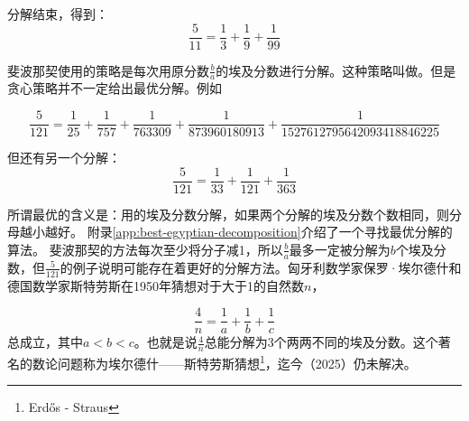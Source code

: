 \documentclass[b5paper]{ctexart}
\begin{document}
分解结束，得到：
\[
\frac{5}{11} = \frac{1}{3} + \frac{1}{9} + \frac{1}{99}
\]

斐波那契使用的策略是每次用原分数$\frac{b}{a}$的埃及分数进行分解。这种策略叫做。但是贪心策略并不一定给出最优分解。例如

\[
\frac{5}{121} = \frac{1}{25} + \frac{1}{757} + \frac{1}{763309} + \frac{1}{873960180913} + \frac{1}{1527612795642093418846225}
\]

但还有另一个分解：
\[
\frac{5}{121} = \frac{1}{33} + \frac{1}{121} + \frac{1}{363}
\]

所谓最优的含义是：用的埃及分数分解，如果两个分解的埃及分数个数相同，则分母越小越好。
附录\ref{app:best-egyptian-decomposition}介绍了一个寻找最优分解的算法。
斐波那契的方法每次至少将分子减1，所以$\frac{b}{a}$最多一定被分解为$b$个埃及分数，但$\frac{5}{121}$的例子说明可能存在着更好的分解方法。匈牙利数学家保罗·埃尔德什和德国数学家斯特劳斯在1950年猜想对于大于1的自然数$n$，

\[
\frac{4}{n} = \frac{1}{a} + \frac{1}{b} + \frac{1}{c}
\]
总成立，其中$a < b < c$。也就是说$\frac{4}{n}$总能分解为3个两两不同的埃及分数。这个著名的数论问题称为埃尔德什——斯特劳斯猜想\footnote{Erdős - Straus}，迄今（2025）仍未解决。
\end{document}
